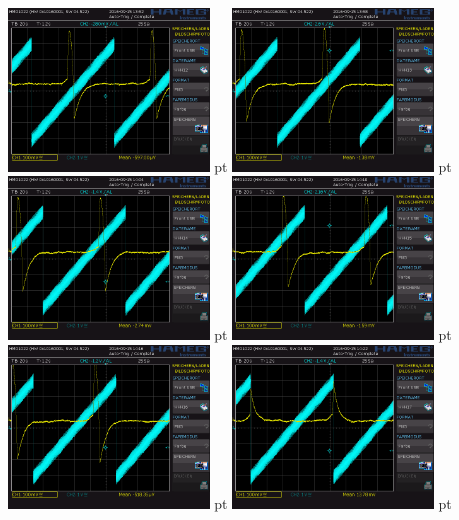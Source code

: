\documentclass[12pt]{article}
\begin{document}
\begin{minipage}[h!]{\textwidth}
	\centering
	\includegraphics[width=0.4\textwidth]{data/HHH12.PNG} pt
	\includegraphics[width=0.4\textwidth]{data/HHH13.PNG} pt	
	\includegraphics[width=0.4\textwidth]{data/HHH14.PNG} pt
	\includegraphics[width=0.4\textwidth]{data/HHH15.PNG} pt
	\includegraphics[width=0.4\textwidth]{data/HHH16.PNG} pt
	\includegraphics[width=0.4\textwidth]{data/HHH17.PNG} pt
\end{minipage}
\end{document}
